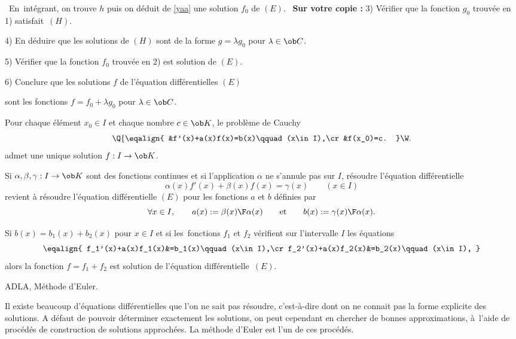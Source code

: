 \noindent\ En~int\'egrant, on trouve $h$ puis on d\'eduit de \eqref{yaa} une solution $f_0$ de $(E)$. \medskip
\noindent\quad\ {\bf Sur votre copie : } 3) V\'erifier que la fonction $g_0$ trouv\'ee en 1) satisfait~$(H)$. 
\medskip
\centerline{4) En d\'eduire que les solutions de $(H)$ sont de la forme $g=\lambda g_0$ pour $\lambda\in\ob C$. }
\medskip

\centerline{5) V\'erifier que la fonction $f_0$ trouv\'ee en 2) est solution de $(E)$. \qquad}
\medskip

\centerline{6) Conclure que les solutions $f$ de l'\'equation diff\'erentielles $(E)$}\centerline{sont les fonctions $f=f_0+\lambda g_0$ pour $\lambda\in \ob C$. }
\bigskip
\noindent
Pour chaque \'el\'ement $x_0\in I$ et chaque nombre $c\in\ob K$, le probl\`eme de Cauchy
$$
\Q\{\eqalign{
&f'(x)+a(x)f(x)=b(x)\qquad(x\in I),\cr
&f(x_0)=c.
}\W.
$$
admet une unique solution $f:I\to\ob K$.
\bigskip

 Si $\alpha,\beta,\gamma:I\to\ob K$ sont des fonctions continues et si l'application $\alpha$ ne s'annule pas sur $I$, r\'esoudre l'\'equation diff\'erentielle 
$$
\alpha(x)f'(x)+\beta(x)f(x)=\gamma(x)\qquad (x\in I)
$$
revient \`a r\'esoudre l'\'equation diff\'erentielle $(E)$ pour les fonctions $a$ et $b$ d\'efinies par 
$$ 
\forall x\in I, \qquad a(x):={\beta(x)\F\alpha(x)}\qquad\mbox{et}\qquad b(x):={\gamma(x)\F\alpha(x)}.
$$

 Si $b(x)=b_1(x)+b_2(x)$ pour $x\in I$ et si les~fonctions $f_1$ et $f_2$ v\'erifient sur l'intervalle $I$ les \'equations 
$$
\eqalign{
f_1'(x)+a(x)f_1(x)&=b_1(x)\qquad(x\in I),\cr
f_2'(x)+a(x)f_2(x)&=b_2(x)\qquad(x\in I),
}
$$ 
alors la fonction $f=f_1+f_2$ est solution de l'\'equation diff\'erentielle~$(E)$. 

\Section ADLA, M\'ethode d'Euler.


Il existe beaucoup d'\'equations diff\'erentielles que l'on ne sait pas r\'esoudre, c'est-\`a-dire dont on ne connait pas la forme explicite des solutions. 
A d\'efaut de pouvoir d\'eterminer exactement les solutions, on peut cependant en chercher de bonnes approximations, \`a~l'aide de proc\'ed\'es de construction de solutions approch\'ees. 
La m\'ethode d'Euler est l'un de ces proc\'ed\'es. \bigskip


